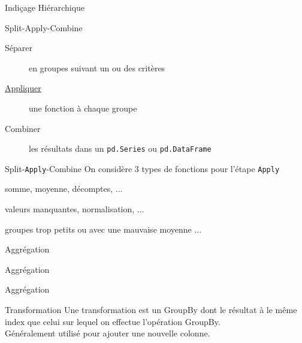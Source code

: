 \begin{frame}{Indiçage Hiérarchique}
\end{frame}

\begin{frame}{Split-Apply-Combine}
  \begin{description}
    \item[Séparer]   en groupes suivant un ou des critères
    \item[\underline{Appliquer}] une fonction à chaque groupe
    \item[Combiner]  les résultats dans un \texttt{pd.Series} ou \texttt{pd.DataFrame}
  \end{description}
\end{frame}

\begin{frame}{Split-\texttt{Apply}-Combine}
  On considère 3 types de fonctions pour l'étape \texttt{Apply}
  \begin{description}[r,labelwidth=\widthof{\bfseries Transformation :}]
    \item[Agrégation :]   somme, moyenne, décomptes, ... 
    \item[Transformation :] valeurs manquantes, normalisation, ... 
    \item[Filtrage :]  groupes trop petits ou avec une mauvaise moyenne ... 
  \end{description}
\end{frame}

\begin{frame}{Aggrégation}
\end{frame}

\begin{frame}{Aggrégation}
\end{frame}

\begin{frame}{Aggrégation}
\end{frame}

\begin{frame}{Transformation}
  Une transformation est un GroupBy dont le résultat à le même index que celui sur lequel on effectue l'opération GroupBy. \\
  Généralement utilisé pour ajouter une nouvelle colonne.
\end{frame}

